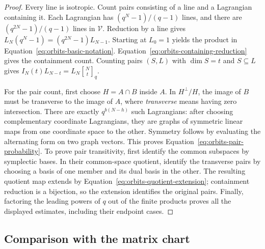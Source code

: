 \begin{proof}
Every line is isotropic.  Count pairs consisting of a line and a Lagrangian
containing it.  Each Lagrangian has $(q^N-1)/(q-1)$ lines, and there are
$(q^{2N}-1)/(q-1)$ lines in $\mathcal V$.  Reduction by a line gives
$L_N(q^N-1)=(q^{2N}-1)L_{N-1}$.  Starting at $L_0=1$ yields the product
in Equation~\eqref{eq:orbits-basic-notation}.
Equation~\eqref{eq:orbits-containing-reduction} gives the containment
count.  Counting pairs $(S,L)$ with $\dim S=t$ and $S\subseteq L$ gives
$I_N(t)L_{N-t}=L_N\genfrac{[}{]}{0pt}{}{N}{t}_q$.

For the pair count, first choose $H=A\cap B$ inside $A$.
In $H^\perp/H$, the image of $B$ must be transverse to the image of $A$,
where \emph{transverse} means having zero intersection.  There are exactly
$q^{b(N-h)}$ such Lagrangians: after choosing complementary coordinate
Lagrangians, they are graphs of symmetric linear maps from one coordinate
space to the other.  Symmetry follows by evaluating the alternating form
on two graph vectors.  This proves Equation~\eqref{eq:orbits-pair-probability}.
To prove pair transitivity, first identify the common subspaces by
symplectic bases.  In their common-space quotient, identify the transverse
pairs by choosing a basis of one member and its dual basis in the other.
The resulting quotient map extends by
Equation~\eqref{eq:orbits-quotient-extension}; containment reduction is a
bijection, so the extension identifies the original pairs.
Finally, factoring the leading powers of $q$ out of the finite products
proves all the displayed estimates, including their endpoint cases.
\end{proof}

\subsection{Comparison with the matrix chart}

